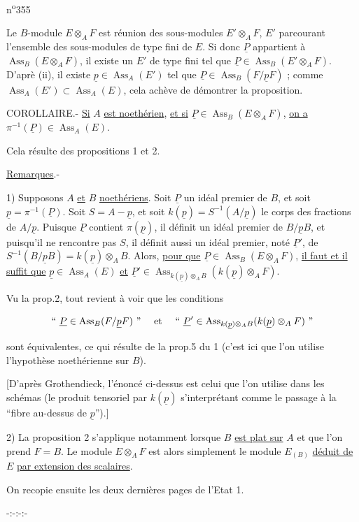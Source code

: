\noindent\hfill n\textsuperscript{o}355

Le $B$-module $E\otimes_A F$ est réunion des sous-modules $E'\otimes_A F$, $E'$ parcourant l'ensemble des sous-modules de type fini de $E$. Si donc $\underline P$ appartient à $\operatorname{Ass}_B(E\otimes_A F)$, il existe un $E'$ de type fini tel que $\underline P\in\operatorname{Ass}_B(E'\otimes_A F)$. D'aprè (ii), il existe $\underline p\in\operatorname{Ass}_A(E')$ tel que $\underline P\in\operatorname{Ass}_B(F/\underline p F)$ ; comme $\operatorname{Ass}_A(E')\subset\operatorname{Ass}_A(E)$, cela achève de démontrer la proposition.

COROLLAIRE.- \uline{Si} $A$ \uline{est noethérien}, \uline{et si} $\underline P\in\operatorname{Ass}_B(E\otimes_A F)$, \uline{on a} $\pi^{-1}(\underline P)\in\operatorname{Ass}_A(E)$.

Cela résulte des propositions 1 et 2.

\uline{Remarques}.-

1) Supposons $A$ \uline{et} $B$ \uline{noethériens}. Soit $\underline P$ un idéal premier de $B$, et soit $\underline p=\pi^{-1}(\underline P)$. Soit $S=A-\underline p$, et soit $k(\underline p)=S^{-1}(A/\underline p)$ le corps des fractions de $A/\underline p$. Puisque $\underline P$ contient $\pi(\underline p)$, il définit un idéal premier de $B/\underline p B$, et puisqu'il ne rencontre pas $S$, il définit aussi un idéal premier, noté $\underline P'$, de $S^{-1}(B/\underline p B)=k(\underline p)\otimes_A B$. Alors, \uline{pour que} $\underline P\in\operatorname{Ass}_B(E\otimes_A F)$, \uline{il faut et il suffit que} $\underline p\in\operatorname{Ass}_A(E)$ \uline{et} $\underline P'\in\operatorname{Ass}_{k(\underline p)\otimes_A B}(k(\underline p)\otimes_A F)$.

Vu la prop.2, tout revient à voir que les conditions

\[
\text{`` }\underline P\in\operatorname{Ass}_B(F/\underline p F)\text{ '' \quad et \quad `` }\underline P'\in\operatorname{Ass}_{k(\underline p)\otimes_A B}(k(\underline p)\otimes_A F)\text{ ''}
\]

sont équivalentes, ce qui résulte de la prop.5 du \handwritten{\S} 1 (c'est ici que l'on utilise l'hypothèse noethérienne sur $B$).

[D'après Grothendieck, l'énoncé ci-dessus est celui que l'on utilise dans les schémas (le produit tensoriel par $k(\underline p)$ s'interprétant comme le passage à la ``fibre au-dessus de $\underline p$'').]

2) La proposition 2 s'applique notamment lorsque $B$ \uline{est plat sur} $A$ et que l'on prend $F=B$. Le module $E\otimes_A F$ est alors simplement le module $E_{(B)}$ \uline{déduit de} $E$ \uline{par extension des scalaires}.

On recopie ensuite les deux dernières pages de l'Etat 1.

\begin{center}-:-:-:-\end{center}

